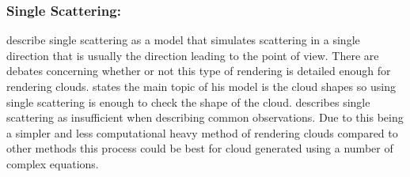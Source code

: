 \subsubsection{Single Scattering:}
\label{sec:single}
\citet*{MHarris01} describe single scattering as a model that simulates scattering in a single direction that is usually the direction leading to the point of view.
There are debates concerning whether or not this type of rendering is detailed enough for rendering clouds.
\citet{Miyazaki01} states the main topic of his model is the cloud shapes so using single scattering is enough to check the shape of the cloud.
\citet{CBohren87} describes single scattering as insufficient when describing common observations.
Due to this being a simpler and less computational heavy method of rendering clouds compared to other methods this process could be best for cloud generated using a number of complex equations.